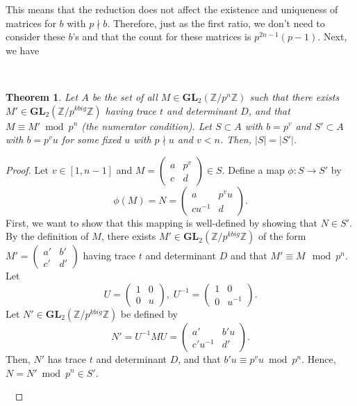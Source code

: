 \documentclass[letterpaper,12pt]{article}
\newtheorem{Theorem}{Theorem}
\newcommand{\Z}{\mathbb{Z}}
\newcommand{\GL}{\mathbf {GL}}
\begin{document}
This means that the reduction does not affect the existence and uniqueness of matrices 
for $b$ with $p \nmid b$.
Therefore, just as the first ratio, we don't need to consider these $b$'s
and that the count for these matrices is $p^{2n-1}(p-1)$.
Next, we have

\

\begin{Theorem}
Let $A$ be the set of all $M \in \GL_2(\Z/p^n\Z)$ 
such that there exists $M' \in \GL_2(\Z/p^{kbig}\Z)$ having 
trace $t$ and determinant $D$, and that $M \equiv M' \bmod p^n$
(the numerator condition).
Let $S \subset A$ with $b = p^v$ and
$S' \subset A$ with $b = p^vu$ for some fixed $u$ with $p \nmid u$
and $v < n$.
Then, $|S| = |S'|$.
\end{Theorem}

\begin{proof}
Let $v \in [1, n-1]$ and $M = \begin{pmatrix}
a & p^v \\ c & d
\end{pmatrix} \in S$.
Define a map $\phi: S \to S'$ by 
\[
\phi(M) = N = \begin{pmatrix}
a & p^vu \\ cu^{-1} & d
\end{pmatrix}.
\]
First, we want to show that this mapping is well-defined 
by showing that $N \in S'$.
By the definition of $M$, there exists $M' \in \GL_2(\Z/p^{kbig}\Z)$
of the form $M' = \begin{pmatrix}
a' & b' \\ c' & d'
\end{pmatrix}$ having trace $t$ and determinant $D$ and
that $M' \equiv M \mod p^n$.
Let 
\[
U = \begin{pmatrix}
1 & 0 \\ 0 & u
\end{pmatrix}, \;
U^{-1} = \begin{pmatrix}
1 & 0 \\ 0 & u^{-1}
\end{pmatrix}.
\]
Let $N' \in \GL_2(\Z/p^{kbig}\Z)$ be defined by 
\[
N' = U^{-1}MU 
= \begin{pmatrix}
a' & b'u \\ c'u^{-1} & d'
\end{pmatrix}.
\]
Then, $N'$ has trace $t$ and determinant $D$, and that 
$b'u \equiv p^v u \bmod p^n$.
Hence, $N = N' \bmod p^n \in S'$.

\


\end{proof}
\end{document}
